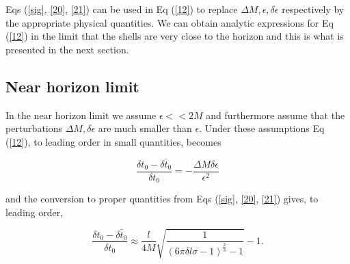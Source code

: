 \documentclass[aps,showpacs,twocolumn,floats,prd,superscriptaddress,nofootinbib]{revtex4-1}
\begin{document}
Eqs (\ref{sig}, \ref{20}, \ref{21}) can be used in Eq (\ref{12}) to replace $\Delta M, \epsilon, \delta \epsilon$ respectively by the appropriate physical quantities. We can obtain analytic expressions for Eq (\ref{12}) in the limit that the shells are very close to the horizon and this is what is presented in the next section. 

\subsection{Near horizon limit}

In the near horizon limit we assume $\epsilon<< 2M$ and furthermore assume that the perturbations $\Delta M, \delta \epsilon$ are much smaller than $\epsilon$. Under these assumptions Eq (\ref{12}), to leading order in small quantities, becomes

\begin{equation}
	\frac{\delta t_0 - \bar{\delta t_0}}{\delta t_0} = - \frac{\Delta M \delta \epsilon}{\epsilon^2}
\end{equation}

and the conversion to proper quantities from Eqs (\ref{sig}, \ref{20}, \ref{21}) gives, to leading order, 

\begin{equation}
	\frac{\delta t_0 - \bar{\delta t_0}}{\delta t_0} \approx \frac{l}{4M} \sqrt{\frac{1}{(6 \pi \delta l \sigma - 1)^\frac{2}{3} -1 }} - 1.
\end{equation}

%
%
%

%
%
%
%











\end{document}
